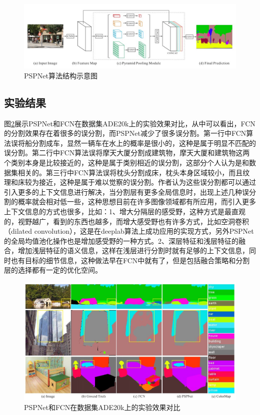 \documentclass[cn]{elegantbook}
\begin{document}
\begin{figure}[!h]
	\centering
	\includegraphics[width=\textwidth]{images/pspnet1.jpg}
	\caption{\label{pspnet1}PSPNet算法结构示意图}
\end{figure}
\subsection{实验结果}
图\ref{pspnet}展示PSPNet和FCN在数据集ADE20k上的实验效果对比，从中可以看出，FCN的分割效果存在着很多的误分割，而PSPNet减少了很多误分割。第一行中FCN算法误将船分割成车，显然一辆车在水上的概率是很小的，这种是属于明显不匹配的误分割。第二行中FCN算法误将摩天大厦分割成建筑物，摩天大厦和建筑物这两个类别本身是比较接近的，这种是属于类别相近的误分割，这部分个人认为是和数据集相关的。第三行中FCN算法误将枕头分割成床，枕头本身区域较小，而且纹理和床较为接近，这种是属于难以觉察的误分割。作者认为这些误分割都可以通过引入更多的上下文信息进行解决，当分割层有更多全局信息时，出现上述几种误分割的概率就会相对低一些，这种思想目前在许多图像领域都有所应用，而引入更多上下文信息的方式也很多，比如：1、增大分隔层的感受野，这种方式是最直观的，视野越广，看到的东西也越多，而增大感受野也有许多方式，比如空洞卷积（dilated convolution），这是在deeplab算法上成功应用的实现方式，另外PSPNet的全局均值池化操作也是增加感受野的一种方式。2、深层特征和浅层特征的融合，增加浅层特征的语义信息，这样在浅层进行分割时就有足够的上下文信息，同时也有目标的细节信息，这种做法早在FCN中就有了，但是包括融合策略和分割层的选择都有一定的优化空间。
\begin{figure}[!h]
	\centering
	\includegraphics[width=\textwidth]{images/pspnet.jpg}
	\caption{\label{pspnet}PSPNet和FCN在数据集ADE20k上的实验效果对比}
\end{figure}
\end{document}
